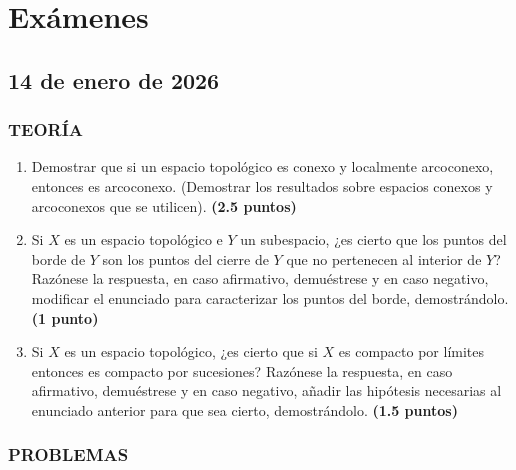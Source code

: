 \chapter{Ex\'amenes} 

\section{14 de enero de 2026} \justifying

\subsection*{TEOR\'IA}

\begin{enumerate}
    \item Demostrar que si un espacio topológico es conexo y localmente arcoconexo, entonces es arcoconexo. (Demostrar los resultados sobre espacios conexos y arcoconexos que se utilicen).
    \hfill \textbf{(2.5 puntos)}

    \item Si $X$ es un espacio topológico e $Y$ un subespacio, ¿es cierto que los puntos del borde de $Y$ son los puntos del cierre de $Y$ que no pertenecen al interior de $Y$? Razónese la respuesta, en caso afirmativo, demuéstrese y en caso negativo, modificar el enunciado para caracterizar los puntos del borde, demostrándolo.
    \hfill \textbf{(1 punto)}

    \item Si $X$ es un espacio topológico, ¿es cierto que si $X$ es compacto por límites entonces es compacto por sucesiones? Razónese la respuesta, en caso afirmativo, demuéstrese y en caso negativo, añadir las hipótesis necesarias al enunciado anterior para que sea cierto, demostrándolo.
    \hfill \textbf{(1.5 puntos)}
\end{enumerate}

\subsection*{PROBLEMAS}

